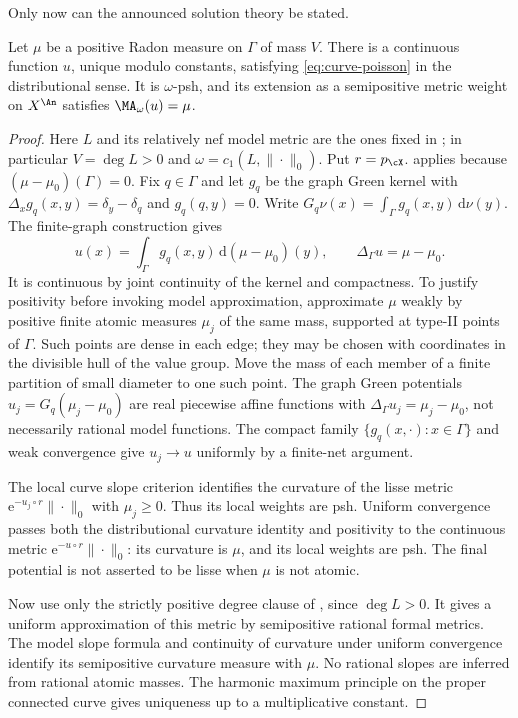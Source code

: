 Only now can the announced solution theory be stated.

\begin{proposition}
\label{prop:graph-ma-solution}
Let \(\mu\) be a positive Radon measure on \(\Gamma\) of mass \(V\).
There is a continuous function \(u\), unique modulo constants, satisfying
\eqref{eq:curve-poisson} in the distributional sense.  It is
\(\omega\)-psh, and its extension as a semipositive metric weight on
\(X^{\An}\) satisfies \(\MA_\omega(u)=\mu\).
\end{proposition}

\begin{proof}
Here $L$ and its relatively nef model metric are the ones fixed in
; in particular $V=\deg L>0$ and
$\omega=c_1(L,\|\cdot\|_0)$.  Put $r=p_{\cX}$.
 applies because
$(\mu-\mu_0)(\Gamma)=0$.
Fix $q\in\Gamma$ and let $g_q$ be the graph Green kernel with
$\Delta_xg_q(x,y)=\delta_y-\delta_q$ and $g_q(q,y)=0$.
Write $G_q\nu(x)=\int_\Gamma g_q(x,y)\,\mathrm d\nu(y)$.
The finite-graph construction gives
\[
 u(x)=\int_\Gamma g_q(x,y)\,\mathrm d(\mu-\mu_0)(y),
 \qquad \Delta_\Gamma u=\mu-\mu_0.
\]
It is continuous by joint continuity of the kernel and compactness.
To justify positivity before invoking model approximation, approximate
\(\mu\) weakly by positive finite atomic measures \(\mu_j\) of the
same mass, supported at type-II points of \(\Gamma\).  Such points are
dense in each edge; they may be chosen with coordinates in the divisible
hull of the value group.  Move the mass of each member of a finite
partition of small diameter to one such point.  The graph Green potentials
\(u_j=G_q(\mu_j-\mu_0)\) are real piecewise affine functions with
\(\Delta_\Gamma u_j=\mu_j-\mu_0\), not necessarily rational model
functions.  The compact family \(\{g_q(x,\cdot):x\in\Gamma\}\) and
weak convergence give \(u_j\to u\) uniformly by a finite-net argument.

The local curve slope criterion identifies the curvature of the lisse
metric \(\mathrm e^{-u_j\circ r}\|\cdot\|_0\) with
\(\mu_j\geq0\).  Thus its local weights are psh.  Uniform convergence
passes both the distributional curvature identity and positivity to the
continuous metric \(\mathrm e^{-u\circ r}\|\cdot\|_0\): its
curvature is \(\mu\), and its local weights are psh.  The final potential
is not asserted to be lisse when \(\mu\) is not atomic.

Now use only the strictly positive degree clause of
, since \(\deg L>0\).
It gives a uniform approximation of this metric by semipositive rational
formal metrics.  The model slope formula and continuity of curvature
under uniform convergence identify its semipositive curvature measure
with \(\mu\).  No rational slopes are inferred from rational atomic
masses.  The harmonic maximum principle on the proper connected curve
gives uniqueness up to a multiplicative constant.


\end{proof}
